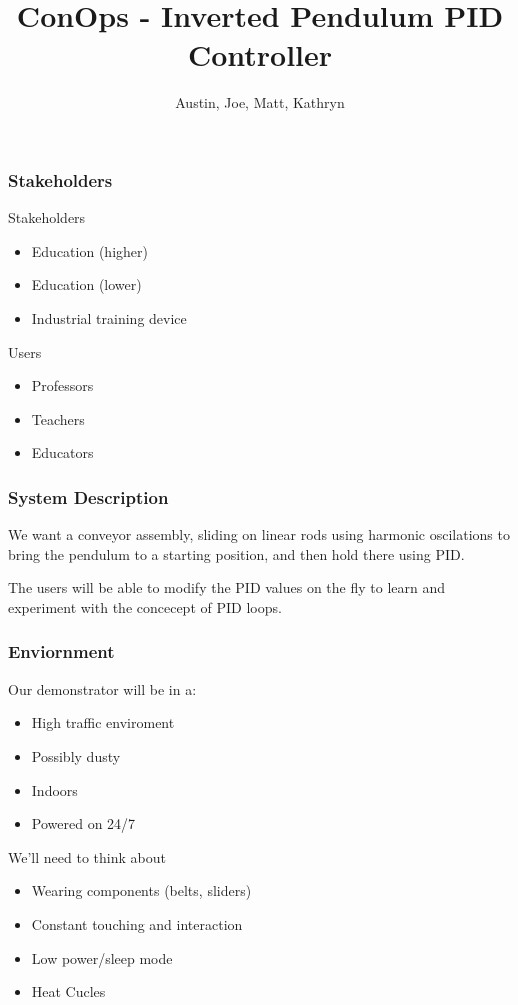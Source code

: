 \documentclass{beamer}
\title{ConOps - Inverted Pendulum PID Controller}
\author{Austin, Joe, Matt, Kathryn}
\institute{SNHU/CETA}
\begin{document}
\frame{\titlepage} %

\begin{frame}
\frametitle{Stakeholders}

\begin{block}{Stakeholders}
    \begin{itemize}
        \item Education (higher)
        \item Education (lower)
        \item Industrial training device
    \end{itemize}
\end{block}

\begin{block}{Users}
    \begin{itemize}
        \item Professors
        \item Teachers
        \item Educators
    \end{itemize}
\end{block}

\end{frame}


\begin{frame}
\frametitle{System Description}

We want a conveyor assembly, sliding on linear rods
using harmonic oscilations to bring the pendulum to a starting position, and then hold there
using PID.

\begin{block}{}
    The users will be able to modify the PID values on the fly to learn and experiment
    with the concecept of PID loops.
\end{block}

\end{frame}


\begin{frame}
\frametitle{Enviornment}

Our demonstrator will be in a:
\begin{itemize}
 \item High traffic enviroment
 \item Possibly dusty
 \item Indoors
 \item Powered on 24/7
\end{itemize}

We'll need to think about

\begin{itemize}
 \item Wearing components (belts, sliders)
 \item Constant touching and interaction
 \item Low power/sleep mode
 \item Heat Cucles
\end{itemize}

\end{frame}
\end{document}
